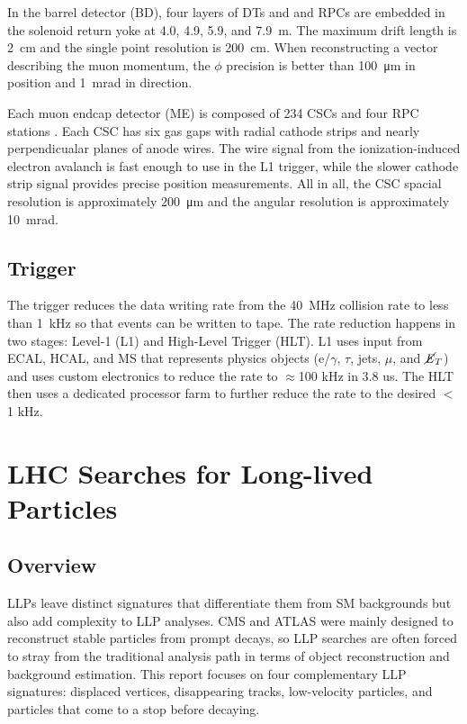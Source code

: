 \documentclass[12pt]{article}
\begin{document}
    In the barrel detector (BD), four layers of DTs and and RPCs are embedded in the solenoid return yoke at \num{4.0}, \num{4.9}, \num{5.9}, and \SI{7.9}{m}. The maximum drift length is \SI{2}{\cm} and the single point resolution is \SI{200}{\cm}. When reconstructing a vector describing the muon momentum, the $\phi$ precision is better than \SI{100}{\micro\m} in position and \SI{1}{\milli\radian} in direction. 

    Each muon endcap detector (ME) is composed of \num{234} CSCs and four RPC stations . Each CSC has six gas gaps with radial cathode strips and nearly perpendicualar planes of anode wires. The wire signal from the ionization-induced electron avalanch is fast enough to use in the L1 trigger, while the slower  cathode strip signal provides precise  position measurements. All in all, the CSC spacial resolution is approximately \SI{200}{\micro\m} and the angular resolution is approximately \SI{10}{\milli\radian}.

\subsection{Trigger}
    The trigger reduces the data writing rate from the \SI{40}{\mega\hertz} collision rate to less than \SI{1}{\kilo\hertz} so that events can be written to tape. The rate reduction happens in two stages: Level-1 (L1) and High-Level Trigger (HLT). L1 uses input from ECAL, HCAL, and MS that represents physics objects ($\mathrm{e}$/$\gamma$, $\tau$, jets, $\mu$, and $\cancel{\it{E}}_{T}$) and uses custom electronics to reduce the rate to $\approx$100 kHz in 3.8 us. The HLT then uses a dedicated processor farm to further reduce the rate to the desired $<$ 1 kHz.

\section{LHC Searches for Long-lived Particles}
\subsection{Overview}
    LLPs leave distinct signatures that differentiate them from SM backgrounds but also add complexity to LLP analyses. CMS and ATLAS were mainly designed to reconstruct stable particles from prompt decays, so LLP searches are often forced to stray from the traditional analysis path in terms of object reconstruction and background estimation. This report focuses on four complementary LLP signatures: displaced vertices, disappearing tracks, low-velocity particles, and particles that come to a stop before decaying.
\end{document}
